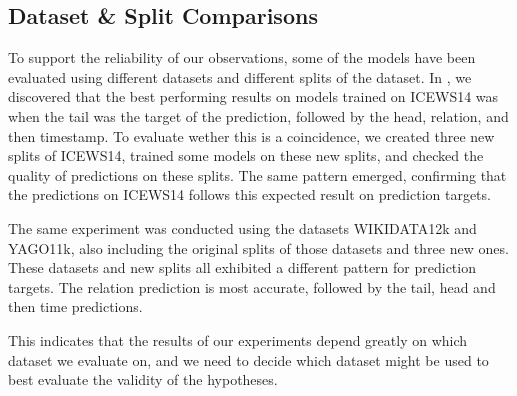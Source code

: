 \subsection{Dataset \& Split Comparisons}
\label{sec:dataset_split_comparisons}

To support the reliability of our observations, some of the models have been evaluated using different datasets and different splits of the dataset. In \cite{P9}, we discovered that the best performing results on models trained on ICEWS14 was when the tail was the target of the prediction, followed by the head, relation, and then timestamp. To evaluate wether this is a coincidence, we created three new splits of ICEWS14, trained some models on these new splits, and checked the quality of predictions on these splits. The same pattern emerged, confirming that the predictions on ICEWS14 follows this expected result on prediction targets.

The same experiment was conducted using the datasets WIKIDATA12k and YAGO11k, also including the original splits of those datasets and three new ones. These datasets and new splits all exhibited a different pattern for prediction targets. The relation prediction is most accurate, followed by the tail, head and then time predictions.

This indicates that the results of our experiments depend greatly on which dataset we evaluate on, and we need to decide which dataset might be used to best evaluate the validity of the hypotheses.